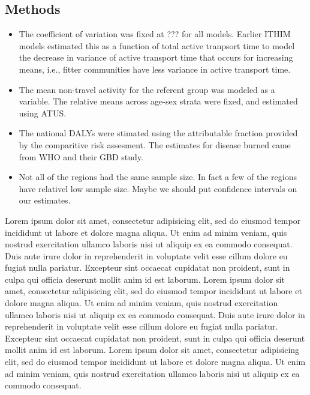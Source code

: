 \documentclass{bioinfo}
\begin{document}
\begin{methods}
\section{Methods}
\begin{itemize}
\item The coefficient of variation was fixed at ??? for all models.
  Earlier ITHIM models estimated this as a function of total active
  tranpsort time to model the decrease in variance of active transport
  time that occurs for increasing means, i.e., fitter communities have
  less variance in active transport time.
\item The mean non-travel activity for the referent group was modeled
  as a variable.  The relative means across age-sex strata were fixed,
  and estimated using ATUS.
\item The national DALYs were stimated using the attributable fraction
  provided by the comparitive risk assesment.  The estimates for
  disease burned came from WHO and their GBD study.
\item Not all of the regions had the same sample size.  In fact a few
  of the regions have relativel low sample size.  Maybe we should put
  confidence intervals on our estimates.
\end{itemize}

Lorem ipsum dolor sit amet, consectetur adipisicing elit, sed do
eiusmod tempor incididunt ut labore et dolore magna aliqua. Ut enim ad
minim veniam, quis nostrud exercitation ullamco laboris nisi ut
aliquip ex ea commodo consequat. Duis aute irure dolor in
reprehenderit in voluptate velit esse cillum dolore eu fugiat nulla
pariatur. Excepteur sint occaecat cupidatat non proident, sunt in
culpa qui officia deserunt mollit anim id est laborum. Lorem ipsum
dolor sit amet, consectetur adipisicing elit, sed do eiusmod tempor
incididunt ut labore et dolore magna aliqua. Ut enim ad minim veniam,
quis nostrud exercitation ullamco laboris nisi ut aliquip ex ea
commodo consequat. Duis aute irure dolor in reprehenderit in voluptate
velit esse cillum dolore eu fugiat nulla pariatur. Excepteur sint
occaecat cupidatat non proident, sunt in culpa qui officia deserunt
mollit anim id est laborum. Lorem ipsum dolor sit amet, consectetur
adipisicing elit, sed do eiusmod tempor incididunt ut labore et dolore
magna aliqua. Ut enim ad minim veniam, quis nostrud exercitation
ullamco laboris nisi ut aliquip ex ea commodo consequat.


\end{methods}
\end{document}
